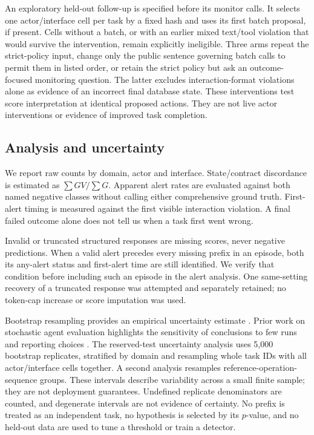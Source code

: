 \documentclass[10pt]{article}
\begin{document}
An exploratory held-out follow-up is specified before its monitor calls. It selects one actor/interface cell per task by a fixed hash and uses its first batch proposal, if present. Cells without a batch, or with an earlier mixed text/tool violation that would survive the intervention, remain explicitly ineligible. Three arms repeat the strict-policy input, change only the public sentence governing batch calls to permit them in listed order, or retain the strict policy but ask an outcome-focused monitoring question. The latter excludes interaction-format violations alone as evidence of an incorrect final database state. These interventions test score interpretation at identical proposed actions. They are not live actor interventions or evidence of improved task completion.

\subsection{Analysis and uncertainty}
We report raw counts by domain, actor and interface. State/contract discordance is estimated as $\sum GV/\sum G$. Apparent alert rates are evaluated against both named negative classes without calling either comprehensive ground truth. First-alert timing is measured against the first visible interaction violation. A final failed outcome alone does not tell us when a task first went wrong.

Invalid or truncated structured responses are missing scores, never negative predictions. When a valid alert precedes every missing prefix in an episode, both its any-alert status and first-alert time are still identified. We verify that condition before including such an episode in the alert analysis. One same-setting recovery of a truncated response was attempted and separately retained; no token-cap increase or score imputation was used.

Bootstrap resampling provides an empirical uncertainty estimate \citep{efron1979bootstrap}. Prior work on stochastic agent evaluation highlights the sensitivity of conclusions to few runs and reporting choices \citep{henderson2018matters,agarwal2021precipice}. The reserved-test uncertainty analysis uses 5,000 bootstrap replicates, stratified by domain and resampling whole task IDs with all actor/interface cells together. A second analysis resamples reference-operation-sequence groups. These intervals describe variability across a small finite sample; they are not deployment guarantees. Undefined replicate denominators are counted, and degenerate intervals are not evidence of certainty. No prefix is treated as an independent task, no hypothesis is selected by its $p$-value, and no held-out data are used to tune a threshold or train a detector.
\end{document}
